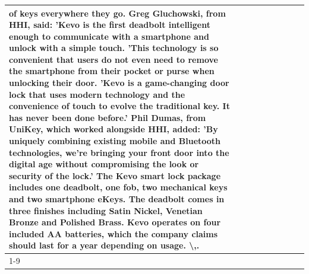\begin{table}[H]
\begin{tabular}{lllrlllll}
of keys everywhere they go. Greg Gluchowski, from HHI, said: 'Kevo is the first deadbolt intelligent enough to communicate with a smartphone and unlock with a simple touch. 'This technology is so convenient that users do not even need to remove the smartphone from their pocket or purse when unlocking their door. 'Kevo is a game-changing door lock that uses modern technology and the convenience of touch to evolve the traditional key. It has never been done before.' Phil Dumas, from UniKey, which worked alongside HHI, added: 'By uniquely combining existing mobile and Bluetooth technologies, we’re bringing your front door into the digital age without compromising the look or security of the lock.' The Kevo smart lock package includes one deadbolt, one fob, two mechanical keys and two smartphone eKeys. The deadbolt comes in three finishes including Satin Nickel, Venetian Bronze and Polished Brass. Kevo operates on four included AA batteries, which the company claims should last for a year depending on usage. \textbackslash ,. \\
\cline{1-9}

\end{tabular}
\end{table}
